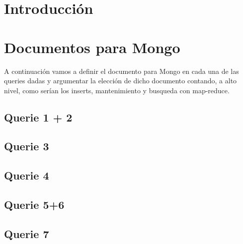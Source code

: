\documentclass[11pt, a4paper]{article}
\begin{document}

\maketitle
\newpage

\tableofcontents
\newpage

%
\section{Introducción}

\section{Documentos para Mongo}

A continuaci\'on vamos a definir el documento para Mongo en cada una de las queries dadas y argumentar la elecci\'on de dicho documento contando, a alto nivel, como ser\'ian los inserts, mantenimiento y busqueda con map-reduce.

\subsection{Querie 1 + 2}

\subsection{Querie 3}

\subsection{Querie 4}

\subsection{Querie 5+6}

\subsection{Querie 7}
\end{document}
